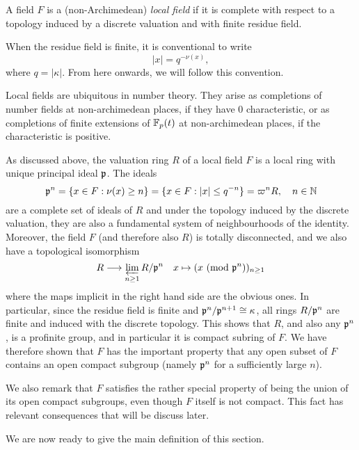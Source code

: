 \begin{defn}
    A field $F$ is a (non-Archimedean) \textit{local field} if it is complete with respect to a topology induced by a discrete valuation and with finite residue field.
\end{defn}

\begin{rem}
    When the residue field is finite, it is conventional to write 
    $$|x|=q^{-\nu(x)},$$ 
    where $q=|\kappa|$. From here onwards, we will follow this convention.
\end{rem}
\begin{rem}
    Local fields are ubiquitous in number theory. They arise as completions of number fields at non-archimedean places, if they have $0$ characteristic, or as completions of finite extensions of $\mathbb{F}_p(t)$ at non-archimedean places, if the characteristic is positive.
\end{rem}

As discussed above, the valuation ring $R$ of a local field $F$ is a local ring with unique principal ideal $\mathfrak{p}$. The ideals 
$$\mathfrak{p}^n=\{x\in F:\nu(x)\geq n\}=\{x\in F: |x|\leq q^{-n}\}=\varpi^n R,\quad n\in\mathbb{N}$$
are a complete set of ideals of $R$ and under the topology induced by the discrete valuation, they are also a fundamental system of neighbourhoods of the identity. Moreover, the field $F$ (and therefore also $R$) is totally disconnected, and we also have a topological isomorphism
$$R\longrightarrow\varprojlim_{n\geq 1} R/\mathfrak{p}^n\quad x\mapsto (x\ (\textrm{mod }{\mathfrak{p}^n}))_{n\geq 1}$$
where the maps implicit in the right hand side are the obvious ones.
In particular, since the residue field is finite and $\mathfrak{p}^{n}/\mathfrak{p}^{n+1}\cong\kappa$, all rings $R/\mathfrak{p}^n$ are finite and induced with the discrete topology. 
This shows that $R$, and also any $\mathfrak{p}^n$, is a profinite group, and in particular it is compact subring of $F$. We have therefore shown that $F$ has the important property that any open subset of $F$ contains an open compact subgroup (namely $\mathfrak{p}^n$ for a sufficiently large $n$). 

We also remark that $F$ satisfies the rather special property of being the union of its open compact subgroups, even though $F$ itself is not compact. This fact has relevant consequences that will be discuss later.

We are now ready to give the main definition of this section.

